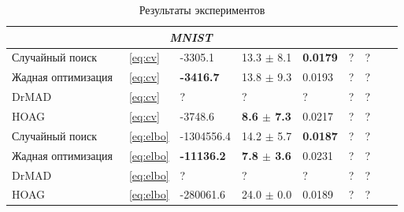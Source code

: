 \begin{table}
\begin{tabularx}{\textwidth}{ |X|X|X|X|X|X|X|X|X|}
\multicolumn{7}{|c|}{\textit{MNIST}}  \\
\hline
Случайный поиск & ~\eqref{eq:cv} & -3305.1  & 13.3 $\pm$ 8.1  &  \bf 0.0179 & ? & ? \\
\hline
Жадная оптимизация & ~\eqref{eq:cv} & \bf -3416.7 & 13.8 $\pm$ 9.3 & 0.0193 & ? & ?\\
\hline
DrMAD & ~\eqref{eq:cv} & ?  &? &  ? & ? & ?\\
\hline
HOAG & ~\eqref{eq:cv} & -3748.6 & \bf 8.6 $\pm$ 7.3&   0.0217 & ? & ? \\
\hline
Случайный поиск & ~\eqref{eq:elbo} & -1304556.4 &  14.2 $\pm$ 5.7 &  \bf 0.0187 & ? & ? \\
\hline
Жадная оптимизация & ~\eqref{eq:elbo} & \bf -11136.2 & \bf 7.8 $\pm$ 3.6  &   0.0231 & ? & ?\\
\hline
DrMAD & ~\eqref{eq:elbo} & ? &   ? & ? & ? & ? \\
\hline
HOAG & ~\eqref{eq:elbo} &  -280061.6 & 24.0 $\pm$ 0.0  &  0.0189 & ? & ?\\
\hline


\hline
\end{tabularx}
\caption{Результаты экспериментов}
\label{table:table}
\end{table}

